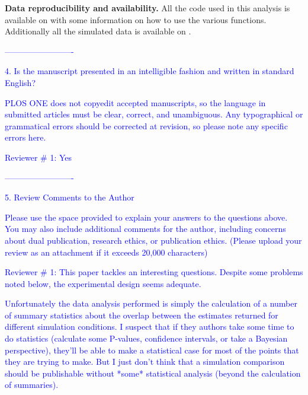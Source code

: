 \documentclass[11pt]{letter}
\begin{document}
\begin{letter}{}
\hfill\begin{minipage}{\dimexpr\textwidth-1cm}
\textbf{Data reproducibility and availability.} All the code used in this analysis is available on \href{https://github.com/TGuillerme/Total_Evidence_Method-Missing_data}{\color{blue}{GitHub}} with some information on how to use the various functions. Additionally all the simulated data is available on \href{http://figshare.com/articles/Effect_of_missing_data_on_topological_inference_using_a_total_evidence_approach/1306861}{\color{blue}{FigShare}}.
\end{minipage}

\textcolor{blue}{-------------------------}

\textcolor{blue}{4. Is the manuscript presented in an intelligible fashion and written in standard English?}

\textcolor{blue}{PLOS ONE does not copyedit accepted manuscripts, so the language in submitted articles must be clear, correct, and unambiguous. Any typographical or grammatical errors should be corrected at revision, so please note any specific errors here.}

\textcolor{blue}{Reviewer $\#$ 1: Yes}

\textcolor{blue}{-------------------------}

\textcolor{blue}{5. Review Comments to the Author}


\textcolor{blue}{Please use the space provided to explain your answers to the questions above. You may also include additional comments for the author, including concerns about dual publication, research ethics, or publication ethics. (Please upload your review as an attachment if it exceeds 20,000 characters)}

\textcolor{blue}{Reviewer $\#$ 1: This paper tackles an interesting questions. Despite some problems noted below, the experimental design seems adequate.}

\textcolor{blue}{Unfortunately the data analysis performed is simply the calculation of a number of summary statistics about the overlap between the estimates returned for different simulation conditions. I suspect that if they authors take some time to do statistics (calculate some P-values, confidence intervals, or take a Bayesian perspective), they'll be able to make a statistical case for most of the points that they are trying to make. But I just don't think that a simulation comparison should be publishable without *some* statistical analysis (beyond the calculation of summaries).}


\end{letter}
\end{document}
